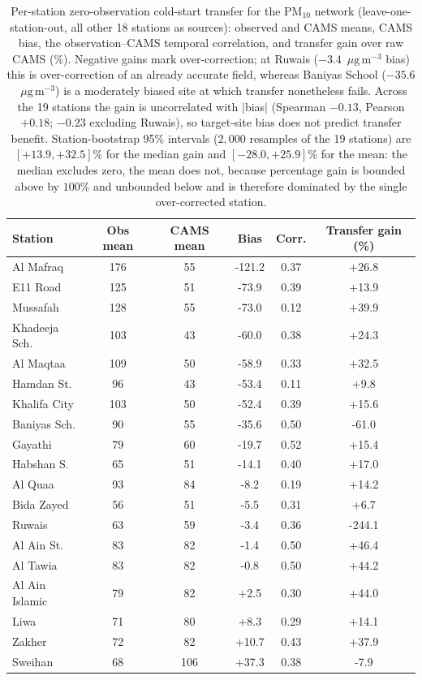 \documentclass[11pt]{article}
\newcommand*{\ugm}{\ensuremath{\mu\mathrm{g\,m^{-3}}}}
\begin{document}
\begin{table}[htbp]\centering\footnotesize
\caption{Per-station zero-observation cold-start transfer for the PM$_{10}$ network (leave-one-station-out, all other 18 stations as sources): observed and CAMS means, CAMS bias, the observation--CAMS temporal correlation, and transfer gain over raw CAMS (\%). Negative gains mark over-correction; at Ruwais ($-3.4$~\ugm{} bias) this is over-correction of an already accurate field, whereas Baniyas School ($-35.6$~\ugm) is a moderately biased site at which transfer nonetheless fails. Across the 19 stations the gain is uncorrelated with $|$bias$|$ (Spearman $-0.13$, Pearson $+0.18$; $-0.23$ excluding Ruwais), so target-site bias does not predict transfer benefit. Station-bootstrap 95\% intervals ($2{,}000$ resamples of the 19 stations) are $[+13.9,+32.5]\%$ for the median gain and $[-28.0,+25.9]\%$ for the mean: the median excludes zero, the mean does not, because percentage gain is bounded above by $100\%$ and unbounded below and is therefore dominated by the single over-corrected station.}
\label{si:t7}
\begin{tabular}{lccccc}\toprule
Station & Obs mean & CAMS mean & Bias & Corr. & Transfer gain (\%) \\ \midrule
Al Mafraq & 176 & 55 & -121.2 & 0.37 & +26.8 \\
E11 Road & 125 & 51 & -73.9 & 0.39 & +13.9 \\
Mussafah & 128 & 55 & -73.0 & 0.12 & +39.9 \\
Khadeeja Sch. & 103 & 43 & -60.0 & 0.38 & +24.3 \\
Al Maqtaa & 109 & 50 & -58.9 & 0.33 & +32.5 \\
Hamdan St. & 96 & 43 & -53.4 & 0.11 & +9.8 \\
Khalifa City & 103 & 50 & -52.4 & 0.39 & +15.6 \\
Baniyas Sch. & 90 & 55 & -35.6 & 0.50 & -61.0 \\
Gayathi & 79 & 60 & -19.7 & 0.52 & +15.4 \\
Habshan S. & 65 & 51 & -14.1 & 0.40 & +17.0 \\
Al Qua\textquotesingle{}a & 93 & 84 & -8.2 & 0.19 & +14.2 \\
Bida Zayed & 56 & 51 & -5.5 & 0.31 & +6.7 \\
Ruwais & 63 & 59 & -3.4 & 0.36 & -244.1 \\
Al Ain St. & 83 & 82 & -1.4 & 0.50 & +46.4 \\
Al Tawia & 83 & 82 & -0.8 & 0.50 & +44.2 \\
Al Ain Islamic & 79 & 82 & +2.5 & 0.30 & +44.0 \\
Liwa & 71 & 80 & +8.3 & 0.29 & +14.1 \\
Zakher & 72 & 82 & +10.7 & 0.43 & +37.9 \\
Sweihan & 68 & 106 & +37.3 & 0.38 & -7.9 \\
\bottomrule\end{tabular}\end{table}
\end{document}
